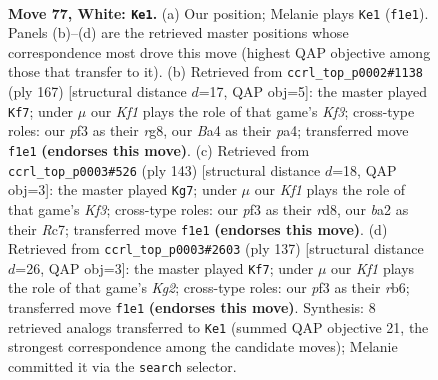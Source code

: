 \documentclass[11pt]{article}
\begin{document}
\clearpage

\begin{figure}[p]\centering
\begin{subfigure}{0.46\textwidth}\centering
\resizebox{\linewidth}{!}{%
\newchessgame
\chessboard[
  setfen={6k1/B1R5/4r3/8/B3p2p/5p1P/b4P2/5K2 w - - 64 77},
  showmover=false,
  pgfstyle=straightmove, color=movearrow, markmove={f1-e1}
]}
\caption{}
\end{subfigure}\hfill
\begin{subfigure}{0.46\textwidth}\centering
\resizebox{\linewidth}{!}{%
\newchessgame
\chessboard[
  setfen={6R1/8/1K3k2/p4p2/Pb1r4/5B1P/6P1/8 b - - 70 84},
  showmover=false,
  pgfstyle=straightmove, color=movearrow, markmove={f6-f7}
]}
\caption{}
\end{subfigure}
\\[4pt]
\begin{subfigure}{0.46\textwidth}\centering
\resizebox{\linewidth}{!}{%
\newchessgame
\chessboard[
  setfen={3R4/2r4p/Bp3k2/2b2p1P/P1P2P2/7K/8/8 b - - 64 72},
  showmover=false,
  pgfstyle=straightmove, color=movearrow, markmove={f6-g7}
]}
\caption{}
\end{subfigure}\hfill
\begin{subfigure}{0.46\textwidth}\centering
\resizebox{\linewidth}{!}{%
\newchessgame
\chessboard[
  setfen={8/4b1k1/1R6/5p2/4r2p/2B4P/6P1/5K2 b - - 13 69},
  showmover=false,
  pgfstyle=straightmove, color=movearrow, markmove={g7-f7}
]}
\caption{}
\end{subfigure}
\caption{\textbf{Move 77, White: \texttt{Ke1}.} (a) Our position; Melanie plays \texttt{Ke1} (\texttt{f1e1}). Panels (b)--(d) are the retrieved master positions whose correspondence most drove this move (highest QAP objective among those that transfer to it). (b) Retrieved from \texttt{ccrl\_top\_p0002\#1138} (ply 167) [structural distance $d$=17, QAP obj=5]: the master played \texttt{Kf7}; under $\mu$ our \emph{Kf1} plays the role of that game's \emph{Kf3}; cross-type roles: our \emph{p}f3 as their \emph{r}g8, our \emph{B}a4 as their \emph{p}a4; transferred move \texttt{f1e1} \textbf{(endorses this move)}. (c) Retrieved from \texttt{ccrl\_top\_p0003\#526} (ply 143) [structural distance $d$=18, QAP obj=3]: the master played \texttt{Kg7}; under $\mu$ our \emph{Kf1} plays the role of that game's \emph{Kf3}; cross-type roles: our \emph{p}f3 as their \emph{r}d8, our \emph{b}a2 as their \emph{R}c7; transferred move \texttt{f1e1} \textbf{(endorses this move)}. (d) Retrieved from \texttt{ccrl\_top\_p0003\#2603} (ply 137) [structural distance $d$=26, QAP obj=3]: the master played \texttt{Kf7}; under $\mu$ our \emph{Kf1} plays the role of that game's \emph{Kg2}; cross-type roles: our \emph{p}f3 as their \emph{r}b6; transferred move \texttt{f1e1} \textbf{(endorses this move)}. Synthesis: 8 retrieved analogs transferred to \texttt{Ke1} (summed QAP objective 21, the strongest correspondence among the candidate moves); Melanie committed it via the \texttt{search} selector.}
\label{fig:thought-m152}
\end{figure}
\end{document}
